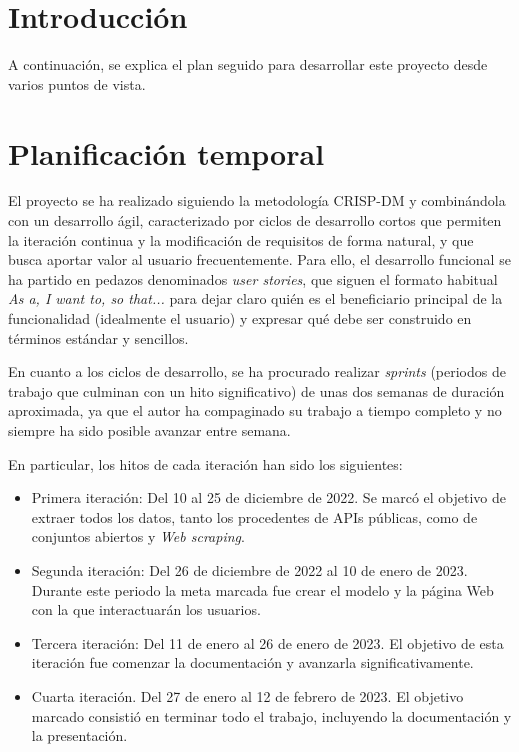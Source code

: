 \section{Introducción}

A continuación, se explica el plan seguido para desarrollar este proyecto desde varios puntos de vista. 

\section{Planificación temporal}

El proyecto se ha realizado siguiendo la metodología CRISP-DM y combinándola con un desarrollo ágil, caracterizado por ciclos de desarrollo cortos que permiten la iteración continua y la modificación de requisitos de forma natural, y que busca aportar valor al usuario frecuentemente. Para ello, el desarrollo funcional se ha partido en pedazos denominados \textit{user stories}, que siguen el formato habitual \textit{As a, I want to, so that...} para dejar claro quién es el beneficiario principal de la funcionalidad (idealmente el usuario) y expresar qué debe ser construido en términos estándar y sencillos.


En cuanto a los ciclos de desarrollo, se ha procurado realizar \textit{sprints} (periodos de trabajo que culminan con un hito significativo) de unas dos semanas de duración aproximada, ya que el autor ha compaginado su trabajo a tiempo completo y no siempre ha sido posible avanzar entre semana.

En particular, los hitos de cada iteración han sido los siguientes:

\begin{itemize}
    \item Primera iteración: Del 10 al 25 de diciembre de 2022. Se marcó el objetivo de extraer todos los datos, tanto los procedentes de APIs públicas, como de conjuntos abiertos y \textit{Web scraping}.
    \item Segunda iteración: Del 26 de diciembre de 2022 al 10 de enero de 2023. Durante este periodo la meta marcada fue crear el modelo y la página Web con la que interactuarán los usuarios.
    \item Tercera iteración: Del 11 de enero al 26 de enero de 2023. El objetivo de esta iteración fue comenzar la documentación y avanzarla significativamente.
    \item Cuarta iteración. Del 27 de enero al 12 de febrero de 2023. El objetivo marcado consistió en terminar todo el trabajo, incluyendo la documentación y la presentación.
\end{itemize}

